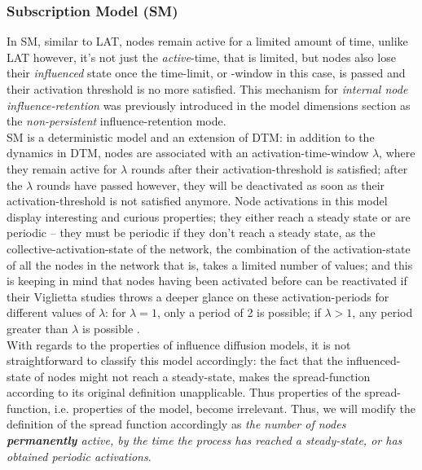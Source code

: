 \documentclass[twocolumn, 10pt]{article}
\begin{document}
\subsubsection{Subscription Model (SM)}
In SM, similar to LAT, nodes remain active for a limited amount of time, unlike LAT however, it's not just the \textit{active}-time, that is limited, but nodes also lose their \textit{influenced} state once the time-limit, or -window in this case, is passed and their activation threshold is no more satisfied. This mechanism for \textit{internal node influence-retention} was previously introduced in the model dimensions section as the \textit{non-persistent} influence-retention mode. \\
SM is a deterministic model and an extension of DTM: in addition to the dynamics in DTM, nodes are associated with an activation-time-window $\lambda$, where they remain active for $\lambda$ rounds after their activation-threshold is satisfied; after the $\lambda$ rounds have passed however, they will be deactivated as soon as their activation-threshold is not satisfied anymore.
Node activations in this model display interesting and curious properties; they either reach a steady state or are periodic -- they must be periodic if they don't reach a steady state, as the collective-activation-state of the network, the combination of the activation-state of all the nodes in the network that is, takes a limited number of values; and this is keeping in mind that nodes having been activated before can be reactivated if their Viglietta studies throws a deeper glance on these activation-periods for different values of $\lambda$: for $\lambda = 1$, only a period of 2 is possible; if $\lambda > 1$, any period greater than $\lambda$ is possible \cite{vig}. \\
With regards to the properties of influence diffusion models, it is not straightforward to classify this model accordingly: the fact that the influenced-state of nodes might not reach a steady-state, makes the spread-function according to its original definition unapplicable. Thus properties of the spread-function, i.e. properties of the model, become irrelevant. Thus, we will modify the definition of the spread function accordingly as \textit{the number of nodes \textbf{permanently} active, by the time the process has reached a steady-state, or has obtained periodic activations}.\\
\end{document}
